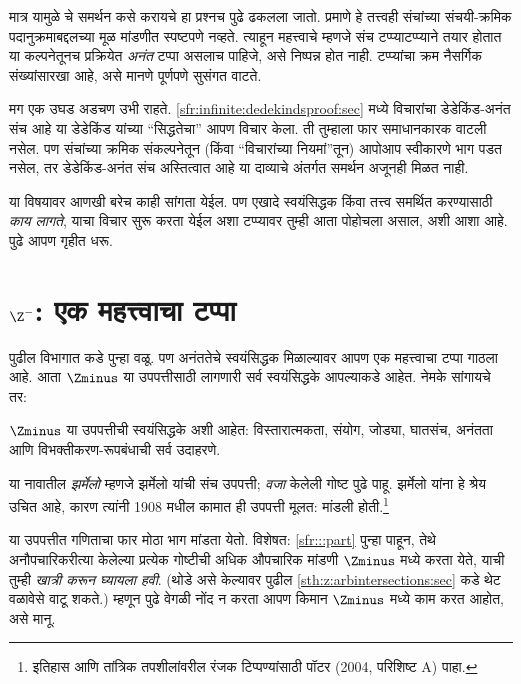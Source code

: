 मात्र यामुळे \stagesinf{} चे समर्थन कसे करायचे हा प्रश्नच पुढे ढकलला जातो. \stagessucc{} प्रमाणे हे तत्त्वही संचांच्या संचयी-क्रमिक पदानुक्रमाबद्दलच्या मूळ मांडणीत स्पष्टपणे नव्हते. त्याहून महत्त्वाचे म्हणजे संच टप्प्याटप्प्याने तयार होतात या कल्पनेतूनच प्रक्रियेत \emph{अनंत} टप्पा असलाच पाहिजे, असे निष्पन्न होत नाही. टप्प्यांचा क्रम नैसर्गिक संख्यांसारखा आहे, असे मानणे पूर्णपणे सुसंगत वाटते.

मग एक उघड अडचण उभी राहते. \ref{sfr:infinite:dedekindsproof:sec} मध्ये विचारांचा डेडेकिंड-अनंत संच आहे या डेडेकिंड यांच्या ``सिद्धतेचा'' आपण विचार केला. ती तुम्हाला फार समाधानकारक वाटली नसेल. पण संचांच्या क्रमिक संकल्पनेतून (किंवा ``विचारांच्या नियमां''तून) \stagesinf{} आपोआप स्वीकारणे भाग पडत नसेल, तर डेडेकिंड-अनंत संच अस्तित्वात आहे या दाव्याचे अंतर्गत समर्थन अजूनही मिळत नाही.

या विषयावर आणखी बरेच काही सांगता येईल. पण एखादे स्वयंसिद्धक किंवा तत्त्व समर्थित करण्यासाठी \emph{काय लागते}, याचा विचार सुरू करता येईल अशा टप्प्यावर तुम्ही आता पोहोचला असाल, अशी आशा आहे. पुढे आपण \stagesinf{} गृहीत धरू.







\section{$\Z^-$: एक महत्त्वाचा टप्पा}\label{sth:z:milestone:sec}

पुढील विभागात \stagesinf{} कडे पुन्हा वळू. पण अनंततेचे स्वयंसिद्धक मिळाल्यावर आपण एक महत्त्वाचा टप्पा गाठला आहे. आता $\Zminus$ या उपपत्तीसाठी लागणारी सर्व स्वयंसिद्धके आपल्याकडे आहेत. नेमके सांगायचे तर:

\begin{defn}
$\Zminus$ या उपपत्तीची स्वयंसिद्धके अशी आहेत: विस्तारात्मकता, संयोग, जोड्या, घातसंच, अनंतता आणि विभक्तीकरण-रूपबंधाची सर्व उदाहरणे.
\end{defn}

या नावातील \emph{झर्मेलो} म्हणजे झर्मेलो यांची संच उपपत्ती; \emph{वजा} केलेली गोष्ट पुढे पाहू. झर्मेलो यांना हे श्रेय उचित आहे, कारण त्यांनी 1908 मधील कामात ही उपपत्ती मूलत: मांडली होती.\footnote{इतिहास आणि तांत्रिक तपशीलांवरील रंजक टिप्पण्यांसाठी पॉटर (2004, परिशिष्ट A) पाहा.}

या उपपत्तीत गणिताचा फार मोठा भाग मांडता येतो. विशेषत: \ref{sfr:::part} पुन्हा पाहून, तेथे अनौपचारिकरीत्या केलेल्या प्रत्येक गोष्टीची अधिक औपचारिक मांडणी $\Zminus$ मध्ये करता येते, याची तुम्ही \emph{खात्री करून घ्यायला हवी}. (थोडे असे केल्यावर पुढील \ref{sth:z:arbintersections:sec} कडे थेट वळावेसे वाटू शकते.) म्हणून पुढे वेगळी नोंद न करता आपण किमान $\Zminus$ मध्ये काम करत आहोत, असे मानू.








